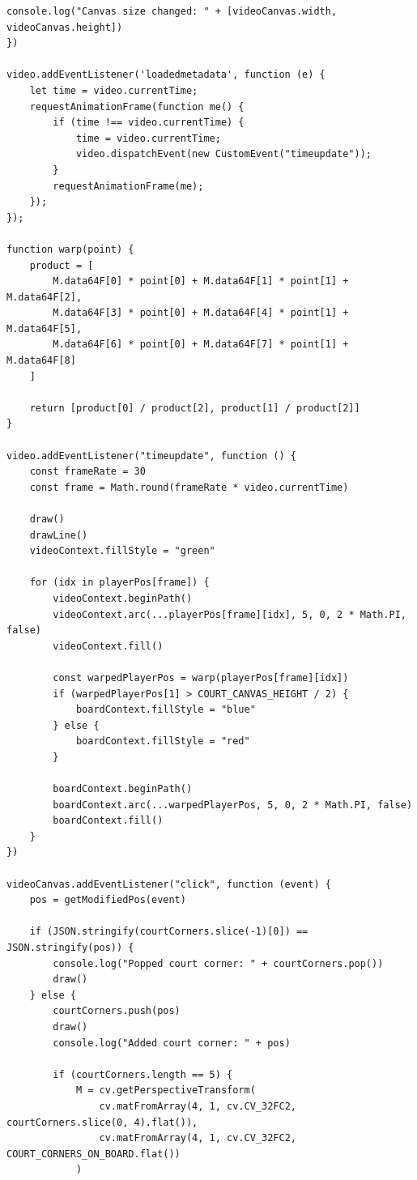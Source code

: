 \documentclass[a4j, fleqn, 12pt]{jsreport}
\begin{document}
\begin{lstlisting}[caption=index.js, label=src:js]
    console.log("Canvas size changed: " + [videoCanvas.width, videoCanvas.height])
})

video.addEventListener('loadedmetadata', function (e) {
    let time = video.currentTime;
    requestAnimationFrame(function me() {
        if (time !== video.currentTime) {
            time = video.currentTime;
            video.dispatchEvent(new CustomEvent("timeupdate"));
        }
        requestAnimationFrame(me);
    });
});

function warp(point) {
    product = [
        M.data64F[0] * point[0] + M.data64F[1] * point[1] + M.data64F[2],
        M.data64F[3] * point[0] + M.data64F[4] * point[1] + M.data64F[5],
        M.data64F[6] * point[0] + M.data64F[7] * point[1] + M.data64F[8]
    ]

    return [product[0] / product[2], product[1] / product[2]]
}

video.addEventListener("timeupdate", function () {
    const frameRate = 30
    const frame = Math.round(frameRate * video.currentTime)

    draw()
    drawLine()
    videoContext.fillStyle = "green"
    
    for (idx in playerPos[frame]) {
        videoContext.beginPath()
        videoContext.arc(...playerPos[frame][idx], 5, 0, 2 * Math.PI, false)
        videoContext.fill()

        const warpedPlayerPos = warp(playerPos[frame][idx])
        if (warpedPlayerPos[1] > COURT_CANVAS_HEIGHT / 2) {
            boardContext.fillStyle = "blue"
        } else {
            boardContext.fillStyle = "red"
        }

        boardContext.beginPath()
        boardContext.arc(...warpedPlayerPos, 5, 0, 2 * Math.PI, false)
        boardContext.fill()
    }
})

videoCanvas.addEventListener("click", function (event) {
    pos = getModifiedPos(event)

    if (JSON.stringify(courtCorners.slice(-1)[0]) == JSON.stringify(pos)) {
        console.log("Popped court corner: " + courtCorners.pop())
        draw()
    } else {
        courtCorners.push(pos)
        draw()
        console.log("Added court corner: " + pos)

        if (courtCorners.length == 5) {
            M = cv.getPerspectiveTransform(
                cv.matFromArray(4, 1, cv.CV_32FC2, courtCorners.slice(0, 4).flat()),
                cv.matFromArray(4, 1, cv.CV_32FC2, COURT_CORNERS_ON_BOARD.flat())
            )


\end{lstlisting}
\end{document}
